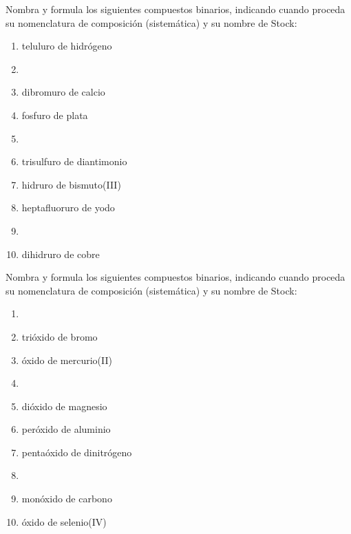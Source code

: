 \documentclass[10pt]{article}
\begin{document}
\begin{exercise}[
    tags    = {inorgánica,compuestos binarios,sales binarias,sales},
    topics  = {química inorgánica,formulación,nomenclatura},
    source  = {SAN Formulación, p26, e30},
  ]

  Nombra y formula los siguientes compuestos binarios, indicando cuando proceda su nomenclatura de composición (sistemática) y su nombre de Stock:

  \begin{enumerate}
    \item teluluro de hidrógeno
    \item {}
    \item dibromuro de calcio
    \item fosfuro de plata
    \item {}
    \item trisulfuro de diantimonio
    \item hidruro de bismuto(III)
    \item heptafluoruro de yodo
    \item {}
    \item dihidruro de cobre
  \end{enumerate}
\end{exercise}


\begin{exercise}[
    tags    = {inorgánica,compuestos binarios,óxidos,peróxidos},
    topics  = {química inorgánica,formulación,nomenclatura},
    source  = {SAN Formulación, p27, e31},
  ]

  Nombra y formula los siguientes compuestos binarios, indicando cuando proceda su nomenclatura de composición (sistemática) y su nombre de Stock:

  \begin{enumerate}
    \item {}
    \item trióxido de bromo
    \item óxido de mercurio(II)
    \item {}
    \item dióxido de magnesio
    \item peróxido de aluminio
    \item pentaóxido de dinitrógeno
    \item {}
    \item monóxido de carbono
    \item óxido de selenio(IV)
  \end{enumerate}
\end{exercise}
\end{document}
